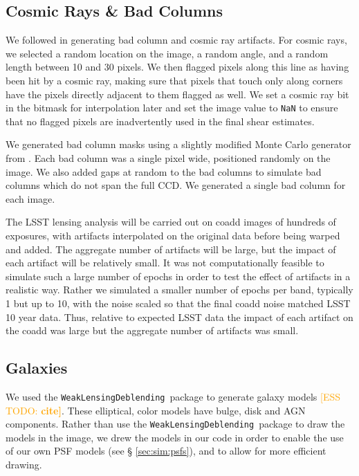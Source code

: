 \documentclass[twocolumn,twocolappendix,astrosym]{openjournal}
\newcommand{\esstodo}[1]{\textcolor{orange}{[ESS TODO: \bf #1]}}
\newcommand{\descwl}{\texttt{WeakLensingDeblending}}
\begin{document}
\subsection{Cosmic Rays \& Bad Columns} \label{sec:sim:cosmics_badcols}

We followed \citet{BeckerMdetCoadd} in generating bad column and cosmic ray artifacts.
For cosmic rays, we selected a random location on the image, a random angle, and a random
length between 10 and 30 pixels. We then flagged pixels along this line as having been hit
by a cosmic ray, making sure that pixels that touch only along corners have the pixels
directly adjacent to them flagged as well. We set a cosmic ray bit in the bitmask for
interpolation later and set the image value to \texttt{NaN} to ensure that no flagged
pixels are inadvertently used in the final shear estimates.

We generated bad column masks using a slightly modified Monte Carlo generator
from \citet{BeckerMdetCoadd}. Each bad column was a single pixel wide,
positioned randomly on the image. We also added gaps at random to the bad
columns to simulate bad columns which do not span the full CCD.  We generated
a single bad column for each image.

The LSST lensing analysis will be carried out on coadd images of hundreds of
exposures, with artifacts interpolated on the original data before being warped
and added.  The aggregate number of artifacts will be large, but the impact of
each artifact will be relatively small.  It was not computationally feasible to
simulate such a large number of epochs in order to test the effect of artifacts
in a realistic way.  Rather we simulated a smaller number of epochs per
band, typically
1 but up to 10, with the noise scaled so that the final coadd noise matched
LSST 10 year data.  Thus, relative to expected LSST data the impact of each
artifact on the coadd was large but the aggregate number of artifacts was
small.

\subsection{Galaxies} \label{sec:sim:galaxies}

We used the \descwl\ package to generate galaxy models \esstodo{cite}.  These
elliptical, color models have bulge, disk and AGN components.  Rather than use
the \descwl\ package to draw the models in the image, we drew the models in our
code in order to enable the use of our own PSF models (see \S
\ref{sec:sim:psfs}), and to allow for more efficient drawing.
\end{document}
